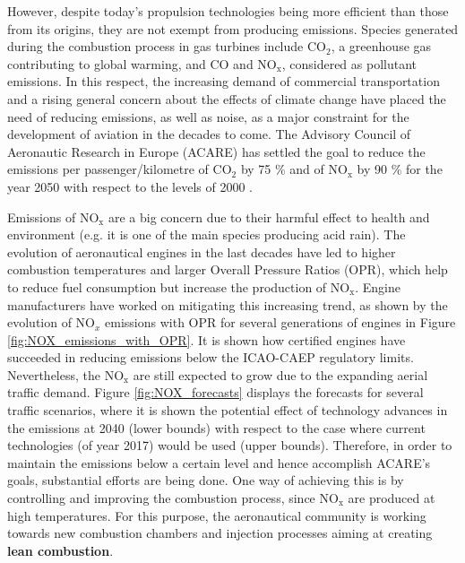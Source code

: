 
However, despite today's propulsion technologies being more efficient than those from its origins, they are not exempt from producing emissions. Species generated during the combustion process in gas turbines include CO$_2$, a greenhouse gas contributing to global warming, and CO and NO$_\mathrm{x}$, considered as pollutant emissions. In this respect, the increasing demand of commercial transportation and a rising general concern about the effects of climate change have placed the need of reducing emissions, as well as noise, as a major constraint for the development of aviation in the decades to come. The Advisory Council of Aeronautic Research in Europe (ACARE) has settled the goal to reduce the emissions per passenger/kilometre of CO$_2$ by 75 $\%$ and of NO$_\mathrm{x}$ by 90 $\%$ for the year 2050 with respect to the levels of 2000 .

Emissions of NO$_\mathrm{x}$ are a big concern due to their harmful effect to health and environment (e.g. it is one of the main species producing acid rain). The evolution of aeronautical engines in the last decades have led to higher combustion temperatures and larger Overall Pressure Ratios (OPR), which help to reduce fuel consumption but increase the production of NO$_\mathrm{x}$. Engine manufacturers have worked on mitigating this increasing trend, as shown by the evolution of NO$_x$ emissions with OPR for several generations of engines in Figure \ref{fig:NOX_emissions_with_OPR}. It is shown how certified engines have succeeded in reducing emissions below the ICAO-CAEP regulatory limits. Nevertheless, the NO$_\mathrm{x}$ are still expected to grow due to the expanding aerial traffic demand. Figure \ref{fig:NOX_forecasts} displays the forecasts for several traffic scenarios, where it is shown the potential effect of technology advances in the emissions at 2040 (lower bounds) with respect to the case where current technologies (of year 2017) would be used (upper bounds). Therefore, in order to maintain the emissions below a certain level and hence accomplish ACARE's goals, substantial efforts are being done. One way of achieving this is by controlling and improving the combustion process, since NO$_\mathrm{x}$ are produced at high temperatures. For this purpose, the aeronautical community is working towards new combustion chambers and injection processes aiming at creating \textbf{lean combustion}.

